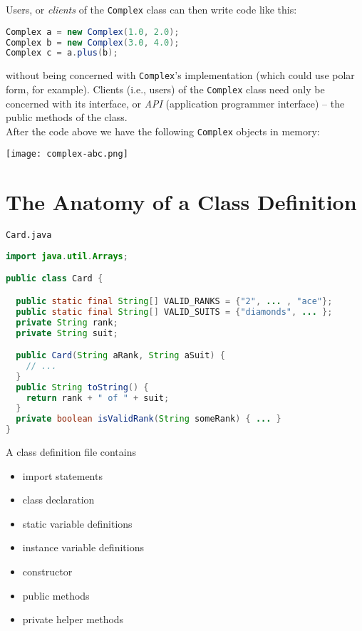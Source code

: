 \documentclass{article}
\begin{document}
Users, or {\it clients} of the {\tt Complex} class can then write code like this:
\begin{lstlisting}[language=Java]
Complex a = new Complex(1.0, 2.0);
Complex b = new Complex(3.0, 4.0);
Complex c = a.plus(b);
\end{lstlisting}

without being concerned with {\tt Complex}'s implementation (which could use polar form, for example).  Clients (i.e., users) of the {\tt Complex} class need only be concerned with its interface, or {\it API} (application programmer interface) -- the public methods of the class.\\

After the code above we have the following {\tt Complex} objects in memory:
\begin{center}
\texttt{[image: complex-abc.png]}
\end{center}


\newpage

\section{The Anatomy of a Class Definition}


\begin{multicols}{2}

{\tt Card.java}

\begin{lstlisting}[language=Java]
import java.util.Arrays;

public class Card {

  public static final String[] VALID_RANKS = {"2", ... , "ace"};
  public static final String[] VALID_SUITS = {"diamonds", ... };
  private String rank;
  private String suit;

  public Card(String aRank, String aSuit) {
    // ...
  }
  public String toString() {
    return rank + " of " + suit;
  }
  private boolean isValidRank(String someRank) { ... }
}
\end{lstlisting}

\columnbreak

A class definition file contains

\begin{itemize}
\item import statements

\item class declaration

\item static variable definitions

\item instance variable definitions

\item constructor

\item public methods

\item private helper methods
\end{itemize}

\end{multicols}
\end{document}
